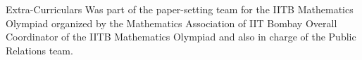\begin{rubric}{Extra-Curriculars}
	\entry*[2024] Was part of the paper-setting team for the IITB Mathematics Olympiad organized by the Mathematics Association of IIT Bombay
	\entry*[2025] Overall Coordinator of the IITB Mathematics Olympiad and also in charge of the Public Relations team.
\end{rubric}